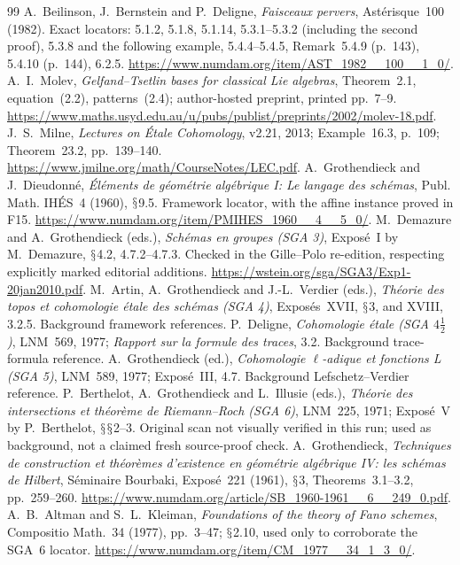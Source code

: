 \documentclass[11pt,a4paper]{article}
\renewcommand{\S}{\ensuremath{\mathsection}}
\theoremstyle{named}\newtheorem{finding}{Finding}[section]
\theoremstyle{definition}\newtheorem{definition}[finding]{Definition}
\theoremstyle{remark}\newtheorem{remark}[finding]{Remark}
\begin{document}
\begin{thebibliography}{99}
 A.~Beilinson, J.~Bernstein and P.~Deligne, \emph{Faisceaux pervers}, Ast\'erisque~100 (1982). Exact locators: 5.1.2, 5.1.8, 5.1.14, 5.3.1--5.3.2 (including the second proof), 5.3.8 and the following example, 5.4.4--5.4.5, Remark~5.4.9 (p.~143), 5.4.10 (p.~144), 6.2.5. \url{https://www.numdam.org/item/AST_1982__100__1_0/}.
 A.~I.~Molev, \emph{Gelfand--Tsetlin bases for classical Lie algebras}, Theorem~2.1, equation~(2.2), patterns~(2.4); author-hosted preprint, printed pp.~7--9. \url{https://www.maths.usyd.edu.au/u/pubs/publist/preprints/2002/molev-18.pdf}.
 J.~S.~Milne, \emph{Lectures on \'Etale Cohomology}, v2.21, 2013; Example~16.3, p.~109; Theorem~23.2, pp.~139--140. \url{https://www.jmilne.org/math/CourseNotes/LEC.pdf}.
 A.~Grothendieck and J.~Dieudonn\'e, \emph{\'El\'ements de g\'eom\'etrie alg\'ebrique I: Le langage des sch\'emas}, Publ. Math. IH\'ES~4 (1960), \S9.5. Framework locator, with the affine instance proved in F15. \url{https://www.numdam.org/item/PMIHES_1960__4__5_0/}.
 M.~Demazure and A.~Grothendieck (eds.), \emph{Sch\'emas en groupes (SGA 3)}, Expos\'e~I by M.~Demazure, \S4.2, 4.7.2--4.7.3. Checked in the Gille--Polo re-edition, respecting explicitly marked editorial additions. \url{https://wstein.org/sga/SGA3/Exp1-20jan2010.pdf}.
 M.~Artin, A.~Grothendieck and J.-L.~Verdier (eds.), \emph{Th\'eorie des topos et cohomologie \'etale des sch\'emas (SGA 4)}, Expos\'es~XVII, \S3, and XVIII, 3.2.5. Background framework references.
 P.~Deligne, \emph{Cohomologie \'etale (SGA $4\frac12$)}, LNM~569, 1977; \emph{Rapport sur la formule des traces}, 3.2. Background trace-formula reference.
 A.~Grothendieck (ed.), \emph{Cohomologie \(\ell\)-adique et fonctions L (SGA 5)}, LNM~589, 1977; Expos\'e~III, 4.7. Background Lefschetz--Verdier reference.
 P.~Berthelot, A.~Grothendieck and L.~Illusie (eds.), \emph{Th\'eorie des intersections et th\'eor\`eme de Riemann--Roch (SGA 6)}, LNM~225, 1971; Expos\'e~V by P.~Berthelot, \S\S2--3. Original scan not visually verified in this run; used as background, not a claimed fresh source-proof check.
 A.~Grothendieck, \emph{Techniques de construction et th\'eor\`emes d'existence en g\'eom\'etrie alg\'ebrique IV: les sch\'emas de Hilbert}, S\'eminaire Bourbaki, Expos\'e~221 (1961), \S3, Theorems~3.1--3.2, pp.~259--260. \url{https://www.numdam.org/article/SB_1960-1961__6__249_0.pdf}.
 A.~B.~Altman and S.~L.~Kleiman, \emph{Foundations of the theory of Fano schemes}, Compositio Math.~34 (1977), pp.~3--47; \S2.10, used only to corroborate the SGA~6 locator. \url{https://www.numdam.org/item/CM_1977__34_1_3_0/}.

\end{thebibliography}
\end{document}
